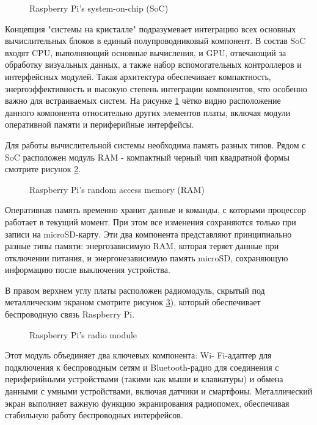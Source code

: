 \begin{figure}[H]
	\centering
	\caption{Raspberry Pi’s system-on-chip (SoC)}
	\label{fig:soc}
\end{figure}

Концепция "системы на кристалле" подразумевает интеграцию всех основных вычислительных блоков в единый полупроводниковый компонент. В состав SoC входят CPU, выполняющий основные вычисления, и GPU, отвечающий за обработку визуальных данных, а также набор вспомогательных контроллеров и интерфейсных модулей. Такая архитектура обеспечивает компактность, энергоэффективность и высокую степень интеграции компонентов, что особенно важно для встраиваемых систем. На рисунке \ref{fig:soc} чётко видно расположение данного компонента относительно других элементов платы, включая модули оперативной памяти и периферийные интерфейсы.

Для работы вычислительной системы необходима память разных типов. Рядом с SoC расположен модуль RAM - компактный черный чип квадратной формы смотрите рисунок \ref{fig:ram}.

\begin{figure}[H]
	\centering
	\caption{Raspberry Pi’s random access memory (RAM)}
	\label{fig:ram}
\end{figure}

Оперативная память временно хранит данные и команды, с которыми процессор работает в текущий момент. При этом все изменения сохраняются только при записи на microSD-карту. Эти два компонента представляют принципиально разные типы памяти: энергозависимую RAM, которая теряет данные при отключении питания, и энергонезависимую память microSD, сохраняющую информацию после выключения устройства.


В правом верхнем углу платы расположен радиомодуль, скрытый под металлическим экраном смотрите рисунок \ref{fig:radio_module}), который обеспечивает беспроводную связь Raspberry Pi.

\begin{figure}[H]
	\centering
	\caption{Raspberry Pi’s radio module}
	\label{fig:radio_module}
\end{figure}

Этот модуль объединяет два ключевых компонента: Wi- Fi-адаптер для подключения к беспроводным сетям и Bluetooth-радио для соединения с периферийными устройствами (такими как мыши и клавиатуры) и обмена данными с умными устройствами, включая датчики и смартфоны. Металлический экран выполняет важную функцию экранирования радиопомех, обеспечивая стабильную работу беспроводных интерфейсов.


